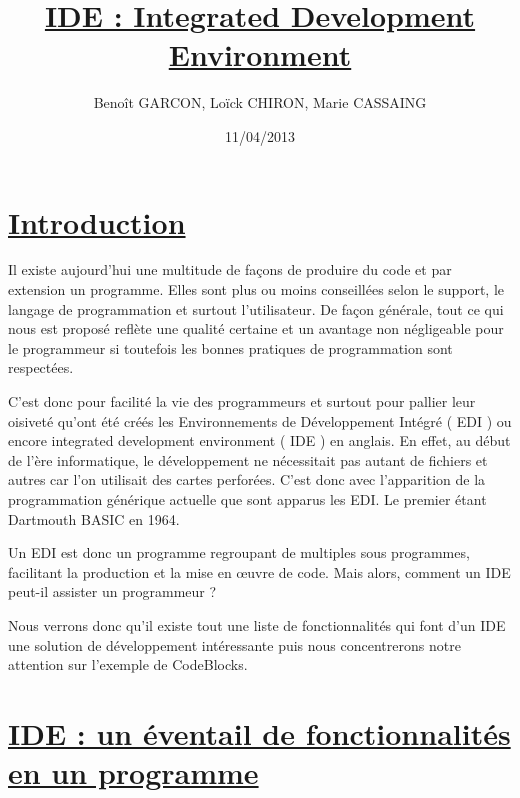 \documentclass[a4paper, 12pt]{article}
\title{\underline{\textbf{IDE : Integrated Development Environment}}}
\author{Benoît GARCON, Loïck CHIRON, Marie CASSAING}
\date{11/04/2013}
\begin{document}
\pagecolor{bleuciel}

\maketitle \vspace {4cm} \thispagestyle{empty}

\setcounter{page}{0}

\newpage \renewcommand{\contentsname}{Sommaire} \tableofcontents
\pagecolor{blanc}

\newpage \section*{\underline{Introduction}} 

\begin{doublespace}


	Il existe aujourd'hui une multitude de façons de produire du code et par extension un programme. Elles sont plus ou moins conseillées selon le support, le langage de programmation et surtout l'utilisateur. De façon générale, tout ce qui nous est proposé reflète une qualité certaine et un avantage non négligeable pour le programmeur si toutefois les bonnes pratiques de programmation sont respectées.

	C'est donc pour facilité la vie des programmeurs et surtout pour pallier leur oisiveté qu'ont été créés les Environnements de Développement Intégré ( EDI ) ou encore integrated development environment ( IDE ) en anglais. En effet, au début de l'ère informatique, le développement ne nécessitait pas autant de fichiers et autres car l'on utilisait des cartes perforées. C'est donc avec l'apparition de la programmation générique actuelle que sont apparus les EDI. Le premier étant Dartmouth BASIC en 1964.

	Un EDI est donc un programme regroupant de multiples sous programmes, facilitant la production et la mise en œuvre de code. Mais alors, comment un IDE peut-il assister un programmeur ?

	Nous verrons donc qu'il existe tout une liste de fonctionnalités qui font d'un IDE une solution de développement intéressante puis nous concentrerons notre attention sur l'exemple de CodeBlocks.
\end{doublespace}

\newpage \section{\underline{IDE : un éventail de fonctionnalités en un programme}}
\end{document}
